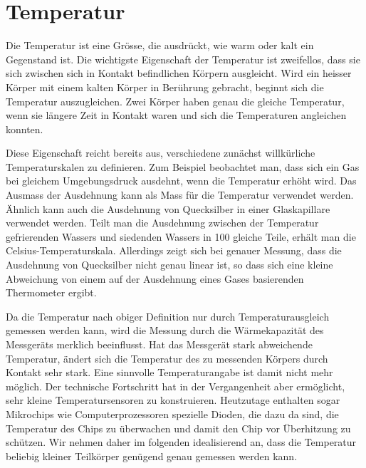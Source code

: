 %
%
%

%
%
\section{Temperatur
\label{buch:fallstudie:temperatur}}
Die Temperatur ist eine Grösse, die ausdrückt, wie warm oder kalt ein
Gegenstand ist.
%
Die wichtigste Eigenschaft der Temperatur ist zweifellos, dass sie
sich zwischen sich in Kontakt befindlichen Körpern ausgleicht.
Wird ein heisser Körper mit einem kalten Körper in Berührung gebracht,
beginnt sich die Temperatur auszugleichen.
Zwei Körper haben genau die gleiche Temperatur, wenn sie längere
Zeit in Kontakt waren und sich die Temperaturen angleichen konnten.

Diese Eigenschaft reicht bereits aus, verschiedene zunächst willkürliche
Temperaturskalen zu definieren.
Zum Beispiel beobachtet man, dass sich ein Gas bei gleichem Umgebungsdruck
ausdehnt, wenn die Temperatur erhöht wird.
%
Das Ausmass der Ausdehnung kann als Mass für die Temperatur verwendet
werden.
Ähnlich kann auch die Ausdehnung von Quecksilber in einer Glaskapillare
verwendet werden.
%
%
Teilt man die Ausdehnung zwischen der Temperatur gefrierenden Wassers und
siedenden Wassers in 100 gleiche Teile, erhält man die Celsius-Temperaturskala.
Allerdings zeigt sich bei genauer Messung, dass die Ausdehnung von
%
Quecksilber nicht genau linear ist, so dass sich eine kleine Abweichung
von einem auf der Ausdehnung eines Gases basierenden Thermometer
ergibt.

Da die Temperatur nach obiger Definition nur durch Temperaturausgleich
gemessen werden kann, wird die Messung durch die Wärmekapazität des
Messgeräts merklich beeinflusst.
Hat das Messgerät stark abweichende Temperatur, ändert sich die Temperatur
des zu messenden Körpers durch Kontakt sehr stark.
Eine sinnvolle Temperaturangabe ist damit nicht mehr möglich.
Der technische Fortschritt hat in der Vergangenheit aber ermöglicht, sehr
kleine Temperatursensoren zu konstruieren.
Heutzutage enthalten sogar Mikrochips wie Computerprozessoren spezielle
Dioden, die dazu da sind, die Temperatur des Chips zu überwachen und damit
den Chip vor Überhitzung zu schützen.
Wir nehmen daher im folgenden idealisierend an, dass die Temperatur beliebig
kleiner Teilkörper genügend genau gemessen werden kann.

%
%
